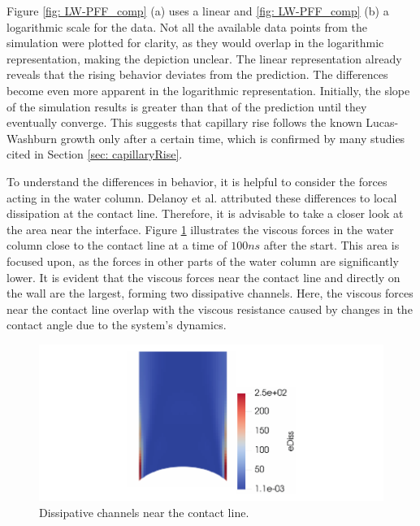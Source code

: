 Figure \ref{fig: LW-PFF_comp} (a) uses a linear and \ref{fig: LW-PFF_comp} (b) a logarithmic scale for the data. Not all the available data points from the simulation were plotted for clarity, as they would overlap in the logarithmic representation, making the depiction unclear. 
The linear representation already reveals that the rising behavior deviates from the prediction. The differences become even more apparent in the logarithmic representation. Initially, the slope of the simulation results is greater than that of the prediction until they eventually converge. This suggests that capillary rise follows the known Lucas-Washburn growth only after a certain time, which is confirmed by many studies cited in Section \ref{sec: capillaryRise}.

To understand the differences in behavior, it is helpful to consider the forces acting in the water column. Delanoy et al. \cite{delannoy2019DualRoleViscosity} attributed these differences to local dissipation at the contact line. Therefore, it is advisable to take a closer look at the area near the interface. Figure \ref{fig: eDiss_wedge} illustrates the viscous forces in the water column close to the contact line at a time of $100ns$ after the start. This area is focused upon, as the forces in other parts of the water column are significantly lower. It is evident that the viscous forces near the contact line and directly on the wall are the largest, forming two dissipative channels. Here, the viscous forces near the contact line overlap with the viscous resistance caused by changes in the contact angle due to the system's dynamics. 

\begin{figure}[h]
    \centering
    \includegraphics[width=.95\textwidth]{Pictures/eDiss_Wedge.pdf}
    \caption{Dissipative channels near the contact line.}
    \label{fig: eDiss_wedge}
\end{figure}

